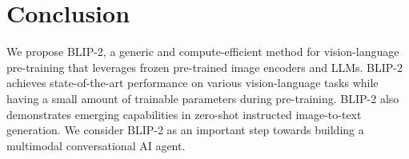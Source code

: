 \section{Conclusion}

\label{sec:conclusion}
We propose BLIP-2, a generic and compute-efficient method for vision-language pre-training that leverages frozen pre-trained image encoders and LLMs. BLIP-2 achieves state-of-the-art performance on various vision-language tasks while having a small amount of trainable parameters during pre-training. BLIP-2 also demonstrates emerging capabilities in zero-shot instructed image-to-text generation. We consider BLIP-2 as an important step towards building a multimodal conversational AI agent.


